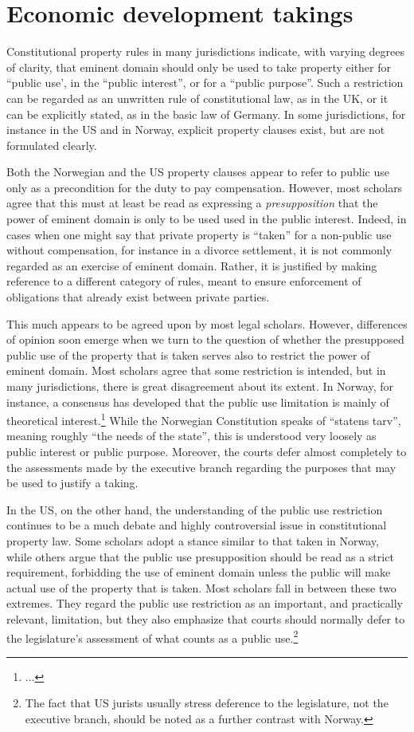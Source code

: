 \section{Economic development takings}

Constitutional property rules in many jurisdictions indicate, with varying degrees of clarity, that eminent domain should only be used to take property either for ``public use', in the ``public interest'', or for a ``public purpose''. Such a restriction can be regarded as an unwritten rule of constitutional law, as in the UK, or it can be explicitly stated, as in the basic law of Germany. In some jurisdictions, for instance in the US and in Norway, explicit property clauses exist, but are not formulated clearly.

Both the Norwegian and the US property clauses appear to refer to public use only as a precondition for the duty to pay compensation. However, most scholars agree that this must at least be read as expressing a {\it presupposition} that the power of eminent domain is only to be used used in the public interest. Indeed, in cases when one might say that private property is ``taken'' for a non-public use without compensation, for instance in a divorce settlement, it is not commonly regarded as an exercise of eminent domain. Rather, it is justified by making reference to a different category of rules, meant to ensure enforcement of obligations that already exist between private parties.

This much appears to be agreed upon by most legal scholars. However, differences of opinion soon emerge when we turn to the question of whether the presupposed public use of the property that is taken serves also to restrict the power of eminent domain. Most scholars agree that some restriction is intended, but in many jurisdictions, there is great disagreement about its extent. In Norway, for instance, a consensus has developed that the public use limitation is mainly of theoretical interest.\footnote{...} While the Norwegian Constitution speaks of ``statens tarv'', meaning roughly ``the needs of the state'', this is understood very loosely as public interest or public purpose. Moreover, the courts defer almost completely to the assessments made by the executive branch regarding the purposes that may be used to justify a taking. 

In the US, on the other hand, the understanding of the public use restriction continues to be a much debate and highly controversial issue in constitutional property law. Some scholars adopt a stance similar to that taken in Norway, while others argue that the public use presupposition should be read as a strict requirement, forbidding the use of eminent domain unless the public will make actual  use of the property that is taken. Most scholars fall in between these two extremes. They regard the public use restriction as an important, and practically relevant, limitation, but they also emphasize that courts should normally defer to the legislature's assessment of what counts as a public use.\footnote{The fact that US jurists usually stress deference to the legislature, not the executive branch, should be noted as a further contrast with Norway.}

